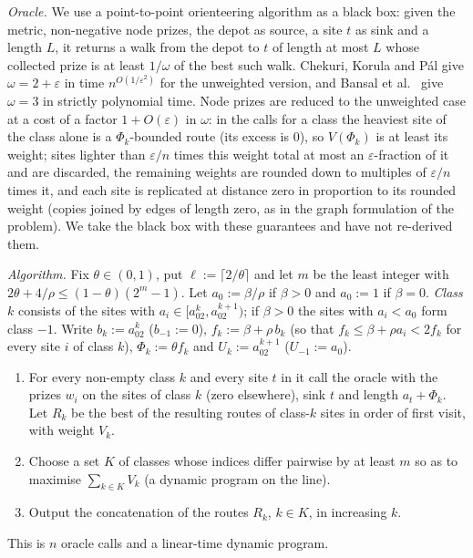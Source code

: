 \documentclass[pdflatex,sn-mathphys-ay]{sn-jnl}
\theoremstyle{thmstyleone}
\theoremstyle{thmstyletwo}
\theoremstyle{thmstylethree}
\begin{document}
\emph{Oracle.} We use a point-to-point orienteering algorithm as a black
box: given the metric, non-negative node prizes, the depot as source, a site
$t$ as sink and a length $L$, it returns a walk from the depot to $t$
of length at most $L$ whose collected prize is at least $1/\omega$ of the
best such walk. Chekuri, Korula and P\'al \citep{chekuri2012} give
$\omega=2+\varepsilon$ in time $n^{O(1/\varepsilon^2)}$ for the
unweighted version, and Bansal et al.\ \citep{bansal2004} give $\omega=3$ in
strictly polynomial time. Node prizes are reduced to the unweighted case at
a cost of a factor $1+O(\varepsilon)$ in $\omega$: in the calls for a class
the heaviest site of the class alone is a $\Phi_k$-bounded route (its
excess is $0$), so $V(\Phi_k)$ is at least its weight; sites lighter than
$\varepsilon/n$ times this weight total at most an $\varepsilon$-fraction of
it and are discarded, the remaining weights are rounded down to multiples
of $\varepsilon/n$ times it, and each site is replicated at distance zero in
proportion to its rounded weight (copies joined by edges of length zero, as in
the graph formulation of the problem). We take the black box with these
guarantees and have not re-derived them.

\emph{Algorithm.} Fix $\theta\in(0,1)$, put $\ell:=\lceil2/\theta\rceil$ and let
$m$ be the least integer with $2\theta+4/\rho\le(1-\theta)(2^m-1)$. Let
$a_0:=\beta/\rho$ if $\beta>0$ and $a_0:=1$ if $\beta=0$. \emph{Class} $k$
consists of the sites with $a_i\in[a_02^k,a_02^{k+1})$; if $\beta>0$ the sites
with $a_i<a_0$ form class $-1$. Write $b_k:=a_02^k$ ($b_{-1}:=0$),
$f_k:=\beta+\rho\,b_k$ (so that $f_k\le\beta+\rho a_i<2f_k$ for every
site $i$ of class $k$), $\Phi_k:=\theta f_k$ and $U_k:=a_02^{k+1}$ ($U_{-1}:=a_0$).
\begin{enumerate}
\item For every non-empty class $k$ and every site $t$ in it call the oracle
with the prizes $w_i$ on the sites of class $k$ (zero elsewhere), sink $t$ and
length $a_t+\Phi_k$. Let $R_k$ be the best of the resulting routes of
class-$k$ sites in order of first visit, with weight $V_k$.
\item Choose a set $K$ of classes whose indices differ pairwise by at
least $m$ so as to maximise $\sum_{k\in K}V_k$ (a dynamic program on the line).
\item Output the concatenation of the routes $R_k$, $k\in K$, in
increasing $k$.
\end{enumerate}
This is $n$ oracle calls and a linear-time dynamic program.
\end{document}
